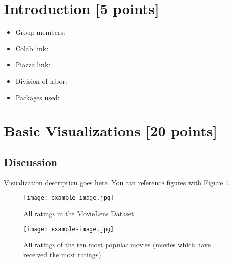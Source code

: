 \newif\ifshowsolutions
\showsolutionstrue







\pagestyle{fancy}




\newpage

\section{Introduction [5 points]}
\begin{itemize}
    \item Group members:
    \item Colab link:
    \item Piazza link:
    \item Division of labor:
    \item Packages used:
\end{itemize}

\newpage

\section{Basic Visualizations [20 points]}

\subsection{Discussion}

Visualization description goes here. You can reference figures with Figure \ref{fig:basic-vis-1}.

\begin{figure}[h]
    \centering
    \texttt{[image: example-image.jpg]}
    \caption{All ratings in the MovieLens Dataset}
    \label{fig:basic-vis-1}
\end{figure}

\begin{figure}[!h]
    \centering
    \texttt{[image: example-image.jpg]}
    \caption{All ratings of the ten most popular movies (movies which have received the most ratings).}
    \label{fig:basic-vis-2}
\end{figure}

